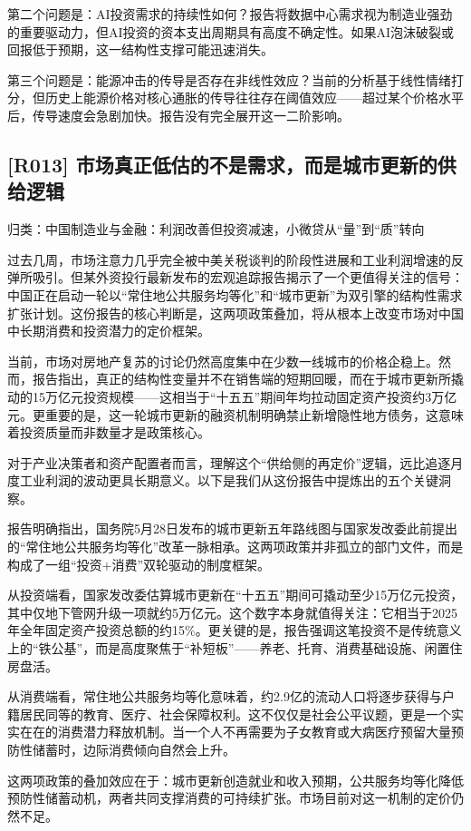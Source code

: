 \documentclass[11pt]{ctexart}
\begin{document}
第二个问题是：AI投资需求的持续性如何？报告将数据中心需求视为制造业强劲的重要驱动力，但AI投资的资本支出周期具有高度不确定性。如果AI泡沫破裂或回报低于预期，这一结构性支撑可能迅速消失。

第三个问题是：能源冲击的传导是否存在非线性效应？当前的分析基于线性情绪打分，但历史上能源价格对核心通胀的传导往往存在阈值效应——超过某个价格水平后，传导速度会急剧加快。报告没有完全展开这一二阶影响。

\subsection{[R013] 市场真正低估的不是需求，而是城市更新的供给逻辑}
{\small\color{refgray}归类：中国制造业与金融：利润改善但投资减速，小微贷从“量”到“质”转向}

过去几周，市场注意力几乎完全被中美关税谈判的阶段性进展和工业利润增速的反弹所吸引。但某外资投行最新发布的宏观追踪报告揭示了一个更值得关注的信号：中国正在启动一轮以“常住地公共服务均等化”和“城市更新”为双引擎的结构性需求扩张计划。这份报告的核心判断是，这两项政策叠加，将从根本上改变市场对中国中长期消费和投资潜力的定价框架。

当前，市场对房地产复苏的讨论仍然高度集中在少数一线城市的价格企稳上。然而，报告指出，真正的结构性变量并不在销售端的短期回暖，而在于城市更新所撬动的15万亿元投资规模——这相当于“十五五”期间年均拉动固定资产投资约3万亿元。更重要的是，这一轮城市更新的融资机制明确禁止新增隐性地方债务，这意味着投资质量而非数量才是政策核心。

对于产业决策者和资产配置者而言，理解这个“供给侧的再定价”逻辑，远比追逐月度工业利润的波动更具长期意义。以下是我们从这份报告中提炼出的五个关键洞察。

报告明确指出，国务院5月28日发布的城市更新五年路线图与国家发改委此前提出的“常住地公共服务均等化”改革一脉相承。这两项政策并非孤立的部门文件，而是构成了一组“投资+消费”双轮驱动的制度框架。

从投资端看，国家发改委估算城市更新在“十五五”期间可撬动至少15万亿元投资，其中仅地下管网升级一项就约5万亿元。这个数字本身就值得关注：它相当于2025年全年固定资产投资总额的约15\%。更关键的是，报告强调这笔投资不是传统意义上的“铁公基”，而是高度聚焦于“补短板”——养老、托育、消费基础设施、闲置住房盘活。

从消费端看，常住地公共服务均等化意味着，约2.9亿的流动人口将逐步获得与户籍居民同等的教育、医疗、社会保障权利。这不仅仅是社会公平议题，更是一个实实在在的消费潜力释放机制。当一个人不再需要为子女教育或大病医疗预留大量预防性储蓄时，边际消费倾向自然会上升。

这两项政策的叠加效应在于：城市更新创造就业和收入预期，公共服务均等化降低预防性储蓄动机，两者共同支撑消费的可持续扩张。市场目前对这一机制的定价仍然不足。
\end{document}
